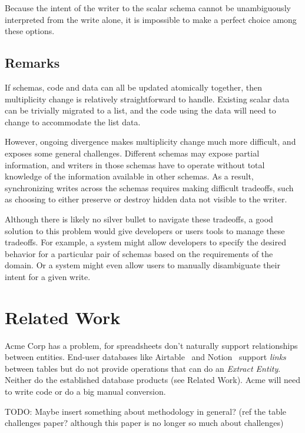 \documentclass[english,submission]{programming}
\begin{document}
Because the intent of the writer to the scalar schema cannot be unambiguously interpreted from the write alone, it is impossible to make a perfect choice among these options.

\subsection{Remarks}

If schemas, code and data can all be updated atomically together, then multiplicity change is relatively straightforward  to handle. Existing scalar data can be trivially migrated to a list, and the code using the data will need to change to accommodate the list data.

However, ongoing divergence makes multiplicity change much more difficult, and exposes some general challenges. Different schemas may expose partial information, and writers in those schemas have to operate without total knowledge of the information available in other schemas. As a result, synchronizing writes across the schemas requires making difficult tradeoffs, such as choosing to either preserve or destroy hidden data not visible to the writer.

Although there is likely no silver bullet to navigate these tradeoffs, a good solution to this problem would give developers or users tools to manage these tradeoffs. For example, a system might allow developers to specify the desired behavior for a particular pair of schemas based on the requirements of the domain. Or a system might even allow users to manually disambiguate their intent for a given write.



\section{Related Work}
\label{sec:related}

Acme Corp has a problem, for spreadsheets don't naturally support relationships between entities.
End-user databases like Airtable~\cite{airtable} and Notion~\cite{notion} support \textit{links}
between tables but do not provide operations that can do an \textit{Extract Entity}. Neither do
the established database products (see Related Work). Acme will need to write code or do a big manual conversion.



TODO: Maybe insert something about methodology in general?
(ref the table challenges paper? although this paper is no longer so much about challenges)
\end{document}
